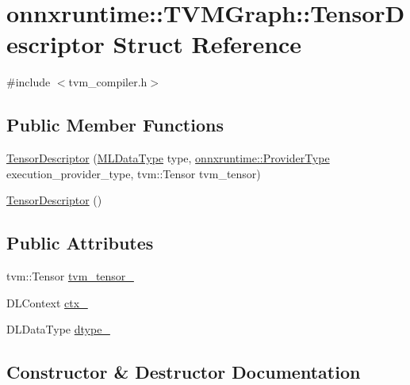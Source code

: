 \hypertarget{structonnxruntime_1_1TVMGraph_1_1TensorDescriptor}{}\section{onnxruntime\+:\+:T\+V\+M\+Graph\+:\+:Tensor\+Descriptor Struct Reference}
\label{structonnxruntime_1_1TVMGraph_1_1TensorDescriptor}


{\ttfamily \#include $<$tvm\+\_\+compiler.\+h$>$}

\subsection*{Public Member Functions}
\begin{DoxyCompactItemize}
\item 
\mbox{\hyperlink{structonnxruntime_1_1TVMGraph_1_1TensorDescriptor_ac159fc85958c5739b0dfecf05587d4d7}{Tensor\+Descriptor}} (\mbox{\hyperlink{namespaceonnxruntime_ad77d0a6e838ec7da5dc35fed5ee66b49}{M\+L\+Data\+Type}} type, \mbox{\hyperlink{namespaceonnxruntime_a863e2227cbf32aab76aad35fdadff4bb}{onnxruntime\+::\+Provider\+Type}} execution\+\_\+provider\+\_\+type, tvm\+::\+Tensor tvm\+\_\+tensor)
\item 
\mbox{\hyperlink{structonnxruntime_1_1TVMGraph_1_1TensorDescriptor_aecce4ca0e8a9809ba2b91d2db3a1749d}{Tensor\+Descriptor}} ()
\end{DoxyCompactItemize}
\subsection*{Public Attributes}
\begin{DoxyCompactItemize}
\item 
tvm\+::\+Tensor \mbox{\hyperlink{structonnxruntime_1_1TVMGraph_1_1TensorDescriptor_abe841f39bfe25bd7b2d396087224529d}{tvm\+\_\+tensor\+\_\+}}
\item 
D\+L\+Context \mbox{\hyperlink{structonnxruntime_1_1TVMGraph_1_1TensorDescriptor_a2e2bb1f6c228b44d8566f7bf33a1065d}{ctx\+\_\+}}
\item 
D\+L\+Data\+Type \mbox{\hyperlink{structonnxruntime_1_1TVMGraph_1_1TensorDescriptor_ae64b6b5fd35fd790bcfa1058ac2ae118}{dtype\+\_\+}}
\end{DoxyCompactItemize}


\subsection{Constructor \& Destructor Documentation}
\mbox{\label{structonnxruntime_1_1TVMGraph_1_1TensorDescriptor_ac159fc85958c5739b0dfecf05587d4d7}} 
